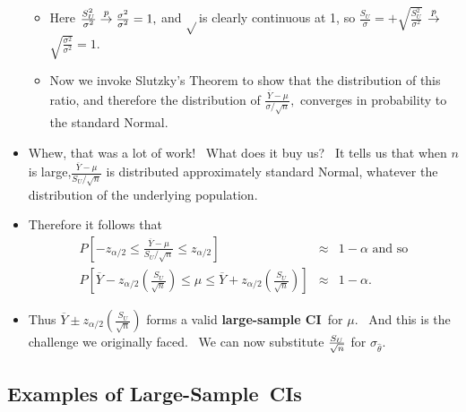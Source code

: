 \documentclass[11pt]{article}
\begin{document}
\begin{itemize}
\begin{itemize}
\item Here $\frac{S_{U}^{2}}{\sigma ^{2}}\overset{p}{\rightarrow }\frac{%
\sigma ^{2}}{\sigma ^{2}}=1,$ and $\sqrt{}$is clearly continuous at 1, so $%
\frac{S_{U}}{\sigma }=+\sqrt{\frac{S_{U}^{2}}{\sigma ^{2}}}$ $\overset{p}{%
\rightarrow }$ $\sqrt{\frac{\sigma ^{2}}{\sigma ^{2}}}=1.$

\item Now we invoke Slutzky's Theorem to show that the distribution of this
ratio, and therefore the distribution of $\frac{\overline{Y}-\mu }{\sigma /%
\sqrt{n}},$ converges in probability to the standard Normal.
\end{itemize}

\item Whew, that was a lot of work! \ What does it buy us? \ It tells us
that when $n$ is large,$\frac{\overline{Y}-\mu }{S_{U}^{{}}/\sqrt{n}}$ is
distributed approximately standard Normal, whatever the distribution of the
underlying population. \ 

\item Therefore it follows that%
\begin{eqnarray*}
P\left[ -z_{\alpha /2}\leq \frac{\overline{Y}-\mu }{S_{U}/\sqrt{n}}\leq
z_{\alpha /2}\right] &\approx &1-\alpha \text{ and so} \\
P\left[ \overline{Y}-z_{\alpha /2}\left( \frac{S_{U}}{\sqrt{n}}\right) \leq
\mu \leq \overline{Y}+z_{\alpha /2}\left( \frac{S_{U}}{\sqrt{n}}\right) %
\right] &\approx &1-\alpha .
\end{eqnarray*}

\item Thus $\overline{Y}\pm z_{\alpha /2}\left( \frac{S_{U}}{\sqrt{n}}%
\right) $ forms a valid \textbf{large-sample CI}\textit{\ }for $\mu .$ \ And
this is the challenge we originally faced. \ We can now substitute $\frac{%
S_{U}}{\sqrt{n}}$ for $\sigma _{\widehat{\theta }}.$
\end{itemize}

\subsection{Examples of Large-Sample\ CIs }
\end{document}
